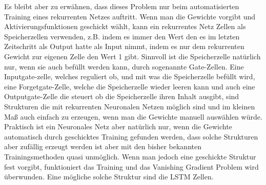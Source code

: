 Es bleibt aber zu erwähnen, dass dieses Problem nur beim automatisierten Training eines rekurrenten Netzes auftritt. Wenn man die Gewichte vorgibt und Aktivierungsfunktionen geschickt wählt, kann ein rekurrentes Netz Zellen als Speicherzellen verwenden, z.B. indem es immer den Wert den es im letzten Zeitschritt als Output hatte als Input nimmt, indem es nur dem rekurrenten Gewicht zur eigenen Zelle den Wert 1 gibt. Sinnvoll ist die Speicherzelle natürlich nur, wenn sie auch befüllt werden kann, durch sogenannte Gate-Zellen. Eine Inputgate-zelle, welches reguliert ob, und mit was die Speicherzelle befüllt wird, eine Forgetgate-Zelle, welche die Speicherzelle wieder leeren kann und auch eine Outputgate-Zelle die steuert ob die Speicherzelle ihren Inhalt ausgibt, sind Strukturen die mit rekurrenten Neuronalen Netzen möglich sind und im kleinen Maß auch einfach zu erzeugen, wenn man die Gewichte manuell auswählen würde. Praktisch ist ein Neuronales Netz aber natürlich nur, wenn die Gewichte automatisch durch geschicktes Training gefunden werden, dass solche Strukturen aber zufällig erzeugt werden ist aber mit den bisher bekannten Trainingsmethoden quasi unmöglich. Wenn man jedoch eine geschickte Struktur fest vorgibt, funktioniert das Training und das Vanishing Gradient Problem wird überwunden. Eine mögliche solche Struktur sind die LSTM Zellen. 
